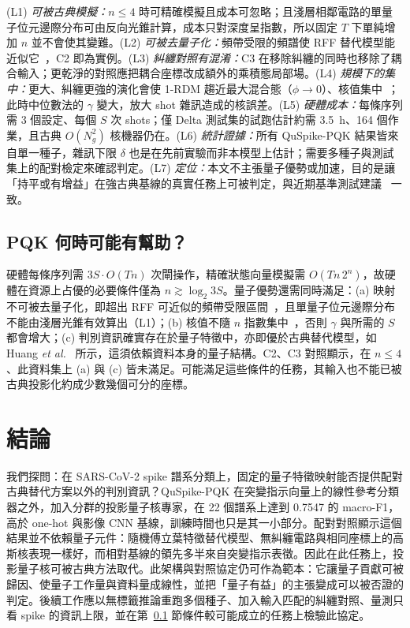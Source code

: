 \documentclass[10pt,a4paper]{article}
\begin{document}
(L1) \emph{可被古典模擬：}$n\le4$ 時可精確模擬且成本可忽略；且淺層相鄰電路的單量子位元邊際分布可由反向光錐計算，成本只對深度呈指數，所以固定 $T$ 下單純增加 $n$ 並不會使其變難。(L2) \emph{可被去量子化：}頻帶受限的頻譜使 RFF 替代模型能近似它~\cite{schreiber2023surrogates,sweke2023rff}，C2 即為實例。(L3) \emph{糾纏對照有混淆：}C3 在移除糾纏的同時也移除了耦合輸入；更乾淨的對照應把耦合座標改成額外的乘積態局部場。(L4) \emph{規模下的集中：}更大、糾纏更強的演化會使 1-RDM 趨近最大混合態（$\phi\to0$）、核值集中~\cite{thanasilp2024concentration}；此時中位數法的 $\gamma$ 變大，放大 shot 雜訊造成的核誤差。(L5) \emph{硬體成本：}每條序列需 3 個設定、每個 $S$ 次 shots；僅 Delta 測試集的試跑估計約需 3.5~h、164 個作業，且古典 $O(N_g^2)$ 核機器仍在。(L6) \emph{統計證據：}所有 QuSpike-PQK 結果皆來自單一種子，雜訊下限 $\delta$ 也是在先前實驗而非本模型上估計；需要多種子與測試集上的配對檢定來確認判定。(L7) \emph{定位：}本文不主張量子優勢或加速，目的是讓「持平或有增益」在強古典基線的真實任務上可被判定，與近期基準測試建議~\cite{bowles2024better} 一致。

\subsection{PQK 何時可能有幫助？}
\label{sec:when}

硬體每條序列需 $3S\cdot O(Tn)$ 次閘操作，精確狀態向量模擬需 $O(Tn\,2^n)$，故硬體在資源上占優的必要條件僅為 $n\gtrsim\log_2 3S$。量子優勢還需同時滿足：(a) 映射不可被去量子化，即超出 RFF 可近似的頻帶受限區間~\cite{schreiber2023surrogates,sweke2023rff}，且單量子位元邊際分布不能由淺層光錐有效算出（L1）；(b) 核值不隨 $n$ 指數集中~\cite{thanasilp2024concentration}，否則 $\gamma$ 與所需的 $S$ 都會增大；(c) 判別資訊確實存在於量子特徵中，亦即優於古典替代模型，如 Huang \textit{et al.}~\cite{huang2021power} 所示，這須依賴資料本身的量子結構。C2、C3 對照顯示，在 $n\le4$、此資料集上 (a) 與 (c) 皆未滿足。可能滿足這些條件的任務，其輸入也不能已被古典投影化約成少數幾個可分的座標。

\section{結論}
\label{sec:conclusion}

我們探問：在 SARS-CoV-2 spike 譜系分類上，固定的量子特徵映射能否提供配對古典替代方案以外的判別資訊？QuSpike-PQK 在突變指示向量上的線性參考分類器之外，加入分群的投影量子核專家，在 22 個譜系上達到 0.7547 的 macro-F1，高於 one-hot 與影像 CNN 基線，訓練時間也只是其一小部分。配對對照顯示這個結果並不依賴量子元件：隨機傅立葉特徵替代模型、無糾纏電路與相同座標上的高斯核表現一樣好，而相對基線的領先多半來自突變指示表徵。因此在此任務上，投影量子核可被古典方法取代。此架構與對照協定仍可作為範本：它讓量子貢獻可被歸因、使量子工作量與資料量成線性，並把「量子有益」的主張變成可以被否證的判定。後續工作應以無標籤推論重跑多個種子、加入輸入匹配的糾纏對照、量測只看 spike 的資訊上限，並在第~\ref{sec:when} 節條件較可能成立的任務上檢驗此協定。
\end{document}

